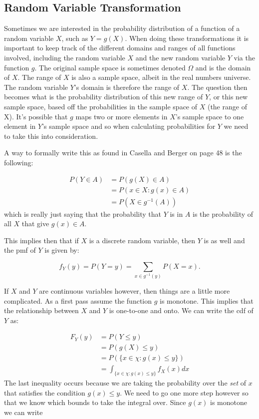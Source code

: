 \subsection{Random Variable Transformation}

Sometimes we are interested in the probability distribution of a function of a random variable $X$, such as $Y=g(X)$. When doing these transformations it is important to keep track of the different domains and ranges of all functions involved, including the random variable $X$ and the new random variable $Y$ via the function $g$. The original sample space is sometimes denoted $\Omega$ and is the domain of $X$. The range of $X$ is also a sample space, albeit in the real numbers universe. The random variable $Y$'s domain is therefore the range of $X$. The question then becomes what is the probability distribution of this new range of $Y$, or this new sample space, based off the probabilities in the sample space of $X$ (the range of X). It's possible that $g$ maps two or more elements in $X$'s sample space to one element in $Y$'s sample space and so when calculating probabilities for $Y$ we need to take this into consideration. 

A way to formally write this as found in Casella and Berger on page 48 is the following:

\begin{equation}
\begin{split}
P(Y \in A ) & = P(g(X) \in A) \\
&= P({x \in X: g(x) \in A}) \\
&= P(X \in g^{-1}(A))
\end{split}
\end{equation}
\noindent which is really just saying that the probability that $Y$ is in $A$ is the probability of all $X$ that give $g(x) \in A$. 

This implies then that if $X$ is a discrete random variable, then $Y$ is as well and the pmf of $Y$ is given by:

\begin{equation}\label{eq:pmf_transform}
f_Y(y) = P(Y=y) = \sum_{x\in g^{-1}(y)} P(X=x).
\end{equation}

If $X$ and $Y$ are continuous variables however, then things are a little more complicated. As a first pass assume the function $g$ is monotone. This implies that the relationship between $X$ and $Y$ is one-to-one and onto. We can write the cdf of $Y$ as:

\begin{equation}
\begin{split}
F_Y(y) &= P(Y \leq y) \\
&= P(g(X) \leq y) \\
&= P(\{x \in \chi :g(x) \leq y \}) \\
&= \int_{\{x \in \chi: g(x) \leq y \}} f_X(x) dx
\end{split}
\end{equation}
\noindent The last inequality occurs because we are taking the probability over the \emph{set} of $x$ that satisfies the condition $g(x) \leq y$. We need to go one more step however so that we know which bounds to take the integral over. Since $g(x)$ is monotone we can write 

